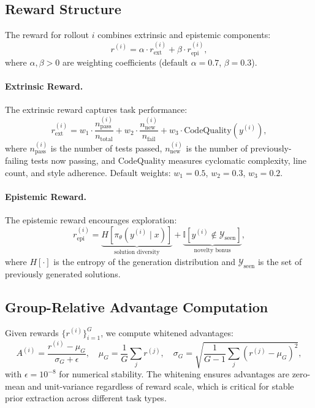 \documentclass[11pt]{article}
\begin{document}
\subsection{Reward Structure}

The reward for rollout $i$ combines extrinsic and epistemic components:
\begin{equation}
    r^{(i)} = \alpha \cdot r_{\text{ext}}^{(i)} + \beta \cdot r_{\text{epi}}^{(i)},
    \label{eq:reward}
\end{equation}
where $\alpha, \beta > 0$ are weighting coefficients (default $\alpha = 0.7$,
$\beta = 0.3$).

\paragraph{Extrinsic Reward.}
The extrinsic reward captures task performance:
\begin{equation}
    r_{\text{ext}}^{(i)} = w_1 \cdot \frac{n_{\text{pass}}^{(i)}}{n_{\text{total}}}
                         + w_2 \cdot \frac{n_{\text{new}}^{(i)}}{n_{\text{fail}}}
                         + w_3 \cdot \text{CodeQuality}(y^{(i)}),
\end{equation}
where $n_{\text{pass}}^{(i)}$ is the number of tests passed, $n_{\text{new}}^{(i)}$
is the number of previously-failing tests now passing, and
$\text{CodeQuality}$ measures cyclomatic complexity, line count, and style
adherence. Default weights: $w_1 = 0.5$, $w_2 = 0.3$, $w_3 = 0.2$.

\paragraph{Epistemic Reward.}
The epistemic reward encourages exploration:
\begin{equation}
    r_{\text{epi}}^{(i)} = \underbrace{H[\pi_\theta(y^{(i)} \mid x)]}_{\text{solution diversity}}
    + \underbrace{\mathbb{I}[y^{(i)} \notin \mathcal{Y}_{\text{seen}}]}_{\text{novelty bonus}},
\end{equation}
where $H[\cdot]$ is the entropy of the generation distribution and
$\mathcal{Y}_{\text{seen}}$ is the set of previously generated solutions.

\subsection{Group-Relative Advantage Computation}

Given rewards $\{r^{(i)}\}_{i=1}^G$, we compute whitened advantages:
\begin{equation}
    A^{(i)} = \frac{r^{(i)} - \mu_G}{\sigma_G + \epsilon},
    \quad \mu_G = \frac{1}{G}\sum_j r^{(j)},
    \quad \sigma_G = \sqrt{\frac{1}{G-1}\sum_j (r^{(j)} - \mu_G)^2},
\end{equation}
with $\epsilon = 10^{-8}$ for numerical stability. The whitening ensures
advantages are zero-mean and unit-variance regardless of reward scale, which is
critical for stable prior extraction across different task types.
\end{document}
